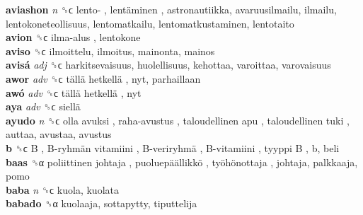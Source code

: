 \textbf{aviashon} \emph{n}  ␝ϲ   lento- ,  lentäminen , astronautiikka, avaruusilmailu, ilmailu, lentokoneteollisuus, lentomatkailu, lentomatkustaminen, lentotaito  \\
\textbf{avion} ␝ϲ   ilma-alus , lentokone  \\
\textbf{aviso} ␝ϲ  ilmoittelu, ilmoitus, mainonta, mainos  \\
\textbf{avisá} \emph{adj}  ␝ϲ  harkitsevaisuus, huolellisuus, kehottaa, varoittaa, varovaisuus  \\
\textbf{awor} \emph{adv}  ␝ϲ   tällä hetkellä , nyt, parhaillaan  \\
\textbf{awó} \emph{adv}  ␝ϲ   tällä hetkellä , nyt  \\
\textbf{aya} \emph{adv}  ␝ϲ   siellä   \\
\textbf{ayudo} \emph{n}  ␝ϲ   olla avuksi ,  raha-avustus ,  taloudellinen apu ,  taloudellinen tuki , auttaa, avustaa, avustus  \\
\textbf{b} ␝ϲ   B ,  B-ryhmän vitamiini ,  B-veriryhmä ,  B-vitamiini ,  tyyppi B , b, beli  \\
\textbf{baas} ␝α   poliittinen johtaja ,  puoluepäällikkö ,  työhönottaja , johtaja, palkkaaja, pomo  \\
\textbf{baba} \emph{n}  ␝ϲ  kuola, kuolata  \\
\textbf{babado} ␝α  kuolaaja, sottapytty, tiputtelija  \\
